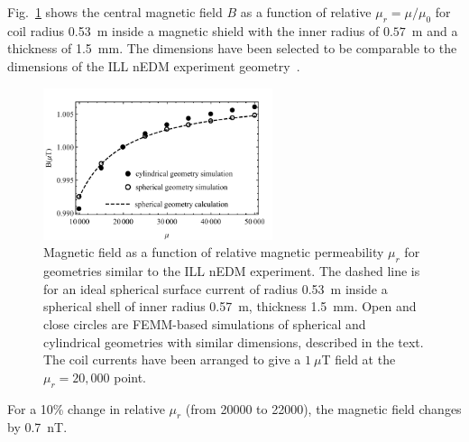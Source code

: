 \documentclass[review]{elsarticle}
\begin{document}


Fig.~\ref{fig:Magnetic_Field} shows the central magnetic field $B$ as
a function of relative $\mu_r=\mu/\mu_0$ for coil radius 0.53~m inside
a magnetic shield with the inner radius of $0.57$~m and a thickness of
1.5~mm.  The dimensions have been selected to be comparable to the
dimensions of the ILL nEDM experiment
geometry~\cite{bib:baker,bib:knecht}.
\begin{figure}[h!]
\begin{center}
   \includegraphics[width=0.6\textwidth]{femm_and_calcs.pdf}
    \caption{Magnetic field as a function of relative magnetic
      permeability $\mu_r$ for geometries similar to the ILL nEDM
      experiment.  The dashed line is for an ideal spherical surface
      current of radius 0.53~m inside a spherical shell of inner
      radius 0.57~m, thickness 1.5~mm.  Open and close circles are
      FEMM-based simulations of spherical and cylindrical geometries
      with similar dimensions, described in the text.  The coil
      currents have been arranged to give a $1~\mu$T field at the
      $\mu_r=20,000$ point.}
    \label{fig:Magnetic_Field}
    \end{center}
\end{figure} 
For a 10\% change in relative $\mu_r$ (from 20000 to 22000), the
magnetic field changes by 0.7~nT.
\end{document}
